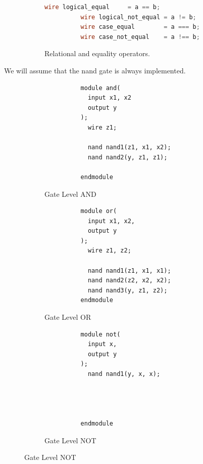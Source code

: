 \begin{definition}
\begin{figure}[H]
\begin{subfigure}[b]{0.48\textwidth}
\begin{lstlisting}[language=Verilog]
          wire logical_equal     = a == b;  
          wire logical_not_equal = a != b;  
          wire case_equal        = a === b; 
          wire case_not_equal    = a !== b; 
        \end{lstlisting}
        \caption{Relational and equality operators.}
      \end{subfigure}
      \caption{}
    \end{figure}
  \end{definition}

  We will assume that the nand gate is always implemented. 

  \begin{definition}
    \label{def:structural-implementation-of-aon}
    \begin{figure}[H]
      \centering 
      \begin{subfigure}[b]{0.32\textwidth}
        \centering
        \begin{lstlisting}
          module and(
            input x1, x2
            output y
          );
            wire z1;

            nand nand1(z1, x1, x2);
            nand nand2(y, z1, z1);

          endmodule
        \end{lstlisting}
        \caption{Gate Level AND}
      \end{subfigure}
      \hfill 
      \begin{subfigure}[b]{0.32\textwidth}
        \centering
        \begin{lstlisting}
          module or(
            input x1, x2, 
            output y
          ); 
            wire z1, z2;

            nand nand1(z1, x1, x1);
            nand nand2(z2, x2, x2); 
            nand nand3(y, z1, z2);
          endmodule
        \end{lstlisting}
        \caption{Gate Level OR}
      \end{subfigure}
      \hfill 
      \begin{subfigure}[b]{0.32\textwidth}
        \centering
        \begin{lstlisting}
          module not(
            input x, 
            output y
          ); 
            nand nand1(y, x, x);




          endmodule
        \end{lstlisting}
        \caption{Gate Level NOT}
      \end{subfigure}


\end{figure}
\end{definition}
